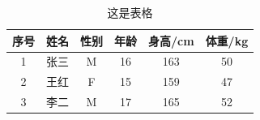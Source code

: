 \begin{ujnbody}
    \begin{table}[!htbp]
        \centering
        \begin{tabular}{cccccc}
            \toprule
            序号 & 姓名 & 性别 & 年龄 & 身高/cm & 体重/kg \\
            \midrule
            1 & 张三 & M & 16 & 163 & 50 \\
            2 & 王红 & F & 15 & 159 & 47 \\
            3 & 李二 & M & 17 & 165 & 52 \\
            \bottomrule
        \end{tabular}
        \caption{这是表格}
    \end{table}

\end{ujnbody}